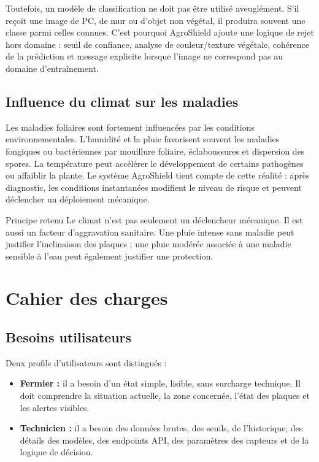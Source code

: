 ﻿\documentclass[11pt,a4paper,openany]{report}
\begin{document}
Toutefois, un modèle de classification ne doit pas être utilisé aveuglément. S'il reçoit une image de PC, de mur ou d'objet non végétal, il produira souvent une classe parmi celles connues. C'est pourquoi AgroShield ajoute une logique de rejet hors domaine : seuil de confiance, analyse de couleur/texture végétale, cohérence de la prédiction et message explicite lorsque l'image ne correspond pas au domaine d'entraînement.

\section{Influence du climat sur les maladies}
Les maladies foliaires sont fortement influencées par les conditions environnementales. L'humidité et la pluie favorisent souvent les maladies fongiques ou bactériennes par mouillure foliaire, éclaboussures et dispersion des spores. La température peut accélérer le développement de certains pathogènes ou affaiblir la plante. Le système AgroShield tient compte de cette réalité : après diagnostic, les conditions instantanées modifient le niveau de risque et peuvent déclencher un déploiement mécanique.

\begin{importantbox}{Principe retenu}
Le climat n'est pas seulement un déclencheur mécanique. Il est aussi un facteur d'aggravation sanitaire. Une pluie intense sans maladie peut justifier l'inclinaison des plaques ; une pluie modérée associée à une maladie sensible à l'eau peut également justifier une protection.
\end{importantbox}

\chapter{Cahier des charges}
\section{Besoins utilisateurs}
Deux profils d'utilisateurs sont distingués :
\begin{itemize}
  \item \textbf{Fermier :} il a besoin d'un état simple, lisible, sans surcharge technique. Il doit comprendre la situation actuelle, la zone concernée, l'état des plaques et les alertes visibles.
  \item \textbf{Technicien :} il a besoin des données brutes, des seuils, de l'historique, des détails des modèles, des endpoints API, des paramètres des capteurs et de la logique de décision.
\end{itemize}
\end{document}
